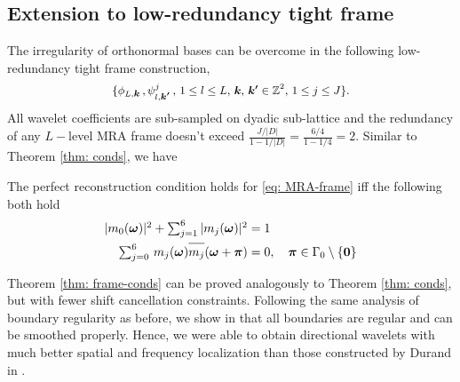 \subsection{Extension to low-redundancy tight frame}\label{sec: frame}
The irregularity of orthonormal bases can be overcome in the following low-redundancy tight frame construction,
 \begin{align}\label{eq: MRA-frame}
 \{\phi_{L,\boldsymbol{k}}\,,\psi^j_{l,\boldsymbol{k'}}\,, \, {\small 1\leq l \leq L,\, \boldsymbol{k},\,\boldsymbol{k'}\in \mathbb{Z}^2,\,1\leq j \leq J\}}.
\end{align}  
All wavelet coefficients are sub-sampled on dyadic sub-lattice and the redundancy of any $L-$level MRA frame doesn't exceed $\frac{J/|D|}{1-1/|D|} = \frac{6/4}{1-1/4} = 2$.
Similar to Theorem \ref{thm: conds}, we have
\begin{thm}\label{thm: frame-conds}
The perfect reconstruction condition holds for \eqref{eq: MRA-frame} iff the following both hold
\begin{align}
\textstyle |m_0(\boldsymbol{\omega})|^2 + \sum_{j = 1}^6|m_j(\boldsymbol{\omega})|^2 &= 1 \\
\textstyle\sum_{j = 0}^6\,m_j(\boldsymbol{\omega})\overlinespace{m_j}(\boldsymbol{\omega} + \boldsymbol{\pi}) &= 0,\quad  \boldsymbol{\pi}\in \Gamma_0\setminus\{\boldsymbol{0}\} \label{eq: reduced-shift-cancel}
\end{align}
\end{thm}
Theorem \ref{thm: frame-conds} can be proved analogously to Theorem \ref{thm: conds}, 
but with fewer shift cancellation constraints. Following the same analysis of boundary regularity as before, we show in \cite{yin2014orthshear} that all boundaries are regular and can be smoothed properly. Hence, we were able to obtain directional wavelets with much better spatial and frequency localization than those constructed by Durand in \cite{durand2007}. 
